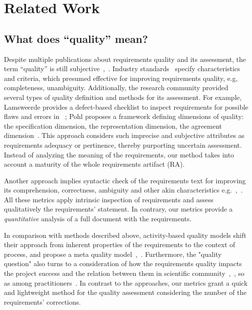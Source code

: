 \section{Related Work}
\label{sec:relatedwork} 

\subsection{What does ``quality'' mean?}

Despite multiple publications about requirements quality and its assessment, 
the term ``quality'' is still subjective~\cite{Mund:2017},~\cite{Femmer:2017}. 
Industry standards~\cite{ISO/IEC/IEEE:2011} specify characteristics and criteria, 
which presumed effective for improving requirements quality, e.g, completeness, unambiguity. 
Additionally, the research community provided several types of quality definition and methods for its assessment. 
For example, Lamsweerde provides a defect-based checklist to inspect requirements for possible flaws 
and errors in ~\cite{Lamsweerde:2009}; Pohl proposes a framework defining dimensions of quality: 
the specification dimension, the representation dimension, the agreement dimension~\cite{POHL:1994}.
This approach considers such imprecise and subjective attributes as requirements adequacy or pertinence, thereby purporting uncertain assessment.
Instead of analyzing the meaning of the requirements, our method takes into account a maturity of the whole requirements artifact (RA).


Another approach implies syntactic check of the requirements text for improving its comprehension, 
correctness, ambiguity and other akin characteristics e.g.~\cite{Ferrari:2014},~\cite{Berry:2006}.
All these metrics apply intrinsic inspection of requirements and assess qualitatively the requirements' statement. 
In contrary, our metrics provide a \textit{quantitative} analysis of a full document with the requirements.

In comparison with methods described above, activity-based quality models shift their approach from inherent properties of the requirements 
to the context of process, and propose a meta quality model~\cite{Wagner:2012},~\cite{Femmer:2015}. 
Furthermore, the "quality question" also turns to a consideration of how the requirements quality impacts the project success and the relation between 
them in scientific community~\cite{Emam:1995},~\cite{Kamata:2007}, so as among practitioners~\cite{BeattyHokanson:2014}.
In contrast to the approaches, our metrics grant a quick and lightweight method for the quality assessment considering the number of the requirements' corrections.

